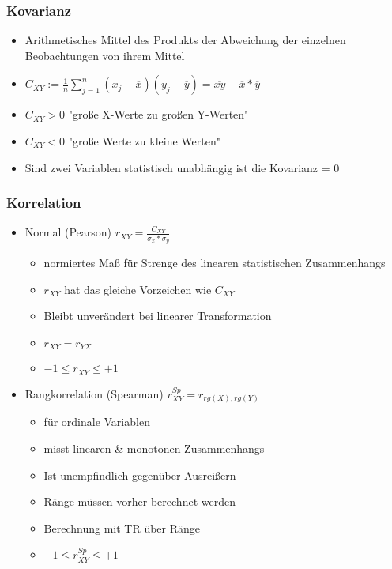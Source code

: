 \documentclass[a4paper]{article}
\begin{document}
\begin{landscape}
\begin{multicols}{4}
    \subsubsection*{Kovarianz}
    \begin{itemize}[noitemsep,nolistsep,leftmargin=*]
        \item Arithmetisches Mittel des Produkts der Abweichung der einzelnen Beobachtungen von ihrem Mittel
        \item $C_{XY} := \frac{1}{n}\sum_{j = 1}^{n}{(x_j - \overline{x})(y_j - \overline{y})} = \overline{xy} - \overline{x}*\overline{y}$ 
        \item  $C_{XY} > 0$ "große X-Werte zu großen Y-Werten"
        \item $C_{XY} < 0$ "große Werte zu kleine Werten"
        \item Sind zwei Variablen statistisch unabhängig ist die Kovarianz = 0
    \end{itemize}

    \subsubsection*{Korrelation}
    \begin{itemize}[noitemsep,nolistsep,leftmargin=*]
        \item Normal (Pearson) $r_{XY} = \frac{C_{XY}}{\sigma_x * \sigma_y}$
        \begin{itemize}[noitemsep,nolistsep,leftmargin=*]
            \item normiertes Maß für Strenge des linearen statistischen Zusammenhangs
            \item $r_{XY}$ hat das gleiche Vorzeichen wie $C_{XY}$
            \item Bleibt unverändert bei linearer Transformation
            \item $r_{XY} = r_{YX}$
            \item $-1 \leq r_{XY} \leq +1$
        \end{itemize}
        \item Rangkorrelation (Spearman) $r_{XY}^{Sp} = r_{rg(X), rg(Y)}$
        \begin{itemize}[noitemsep,nolistsep,leftmargin=*]
            \item für ordinale Variablen
            \item misst linearen \& monotonen Zusammenhangs
            \item Ist unempfindlich gegenüber Ausreißern
            \item Ränge müssen vorher berechnet werden
            \item Berechnung mit TR über Ränge
            \item $-1 \leq r_{XY}^{Sp} \leq +1$


\end{itemize}
\end{itemize}
\end{multicols}
\end{landscape}
\end{document}
